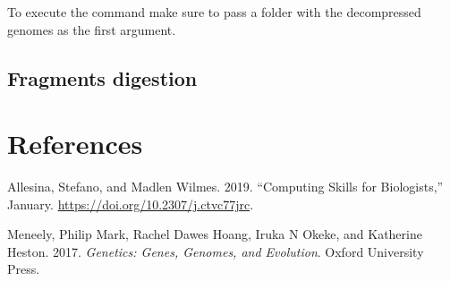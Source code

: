 \documentclass[
  letterpaper,
  DIV=11,
  numbers=noendperiod,
  oneside]{scrreprt}
\newenvironment{Shaded}{\begin{snugshade}}{\end{snugshade}}
\newcommand{\AttributeTok}[1]{\textcolor[rgb]{0.40,0.45,0.13}{#1}}
\newcommand{\BuiltInTok}[1]{\textcolor[rgb]{0.00,0.23,0.31}{#1}}
\newcommand{\CommentTok}[1]{\textcolor[rgb]{0.37,0.37,0.37}{#1}}
\newcommand{\ControlFlowTok}[1]{\textcolor[rgb]{0.00,0.23,0.31}{#1}}
\newcommand{\FunctionTok}[1]{\textcolor[rgb]{0.28,0.35,0.67}{#1}}
\newcommand{\KeywordTok}[1]{\textcolor[rgb]{0.00,0.23,0.31}{#1}}
\newcommand{\NormalTok}[1]{\textcolor[rgb]{0.00,0.23,0.31}{#1}}
\newcommand{\OperatorTok}[1]{\textcolor[rgb]{0.37,0.37,0.37}{#1}}
\newcommand{\OtherTok}[1]{\textcolor[rgb]{0.00,0.23,0.31}{#1}}
\newcommand{\StringTok}[1]{\textcolor[rgb]{0.13,0.47,0.30}{#1}}
\newcommand{\VariableTok}[1]{\textcolor[rgb]{0.07,0.07,0.07}{#1}}
\newlength{\cslhangindent}
\newlength{\cslentryspacingunit} %
\newenvironment{CSLReferences}[2] %
 {%
  \setlength{\parindent}{0pt}
  \ifodd #1
  \let\oldpar\par
  \def\par{\hangindent=\cslhangindent\oldpar}
  \fi
  \setlength{\parskip}{#2\cslentryspacingunit}
 }%
 {}
\begin{document}
\begin{Shaded}
\end{Shaded}

To execute the command make sure to pass a folder with the decompressed
genomes as the first argument.

\hypertarget{fragments-digestion}{%
\section*{Fragments digestion}\label{fragments-digestion}}


\hypertarget{references}{%
\chapter*{References}\label{references}}

\hypertarget{refs}{}
\begin{CSLReferences}{1}{0}
\leavevmode{}%
Allesina, Stefano, and Madlen Wilmes. 2019. {``Computing Skills for
Biologists,''} January. \url{https://doi.org/10.2307/j.ctvc77jrc}.

\leavevmode{}%
Meneely, Philip Mark, Rachel Dawes Hoang, Iruka N Okeke, and Katherine
Heston. 2017. \emph{Genetics: Genes, Genomes, and Evolution}. Oxford
University Press.

\end{CSLReferences}
\end{document}
